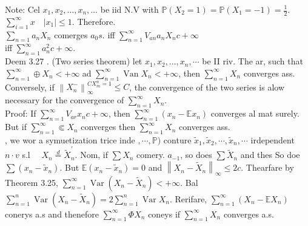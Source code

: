 \documentclass[11pt]{amsbook}
\theoremstyle{plain}%
\theoremstyle{definition}
\theoremstyle{remark}
\begin{document}
Note: Cel $x_{1}, x_{2}, \ldots, x_{n}, \ldots$ be iid N.V with $\mathbb{P}\left(X_{2}=1\right)=\mathbb{P}\left(X_{1}=-1\right)=\frac{1}{2}$.\\
$\sum_{i=1}^{\infty} x \quad\left|x_{1}\right| \leqslant 1$. Therefore.\\
$\sum_{n=1} a_{n} X_{n}$ comerges $a_{0} s$. iff $\sum_{n=1}^{\infty} V_{a n} a_{n} X_{n} c+\infty$\\
iff $\sum_{n=1}^{\infty} a_{n}^{2} c+\infty$.\\
Deem 3.27 . (Two series theorem) let $x_{1}, x_{2}, \ldots, x_{n}, \cdots$ be II riv. The ar, such that $\sum_{n=1}^{\infty} \oplus X_{n}<+\infty$ ad $\sum_{n=1}^{\infty} \operatorname{Van} X_{n}<+\infty$, then $\sum_{n=1}^{\infty} X_{n}$ converges ass. Conversely, if $\left\|X_{n}^{-}\right\|_{\infty}^{C X_{m}^{n}=1} \leq C$, the convergence of the two series is alow necessary for the convergence of $\sum_{n=1}^{\infty} X_{n}$.\\
Proof: If $\sum_{n=1}^{\infty} V_{a r} x_{n} c+\infty$, then $\sum_{n=1}^{\infty}\left(x_{n}-\mathbb{E} x_{n}\right)$ converges al mat surely. But if $\sum_{n=1}^{\infty} \Subset X_{n}$ converges then $\sum_{n=1}^{\infty} X_{n}$ converges ass.\\
, we wor a symuetization trice inde $, \cdots, \mathbb{P})$ conture $\tilde{x}_{1}, \tilde{x}_{2}, \cdots, \tilde{x}_{n}, \cdots$ irdependent $n \cdot v$ s.l $\quad X_{n} \stackrel{d}{=} \tilde{X}_{n}^{\prime}$. Nom, if $\sum X_{n}$ comery. $a_{-1}$, so does $\sum \tilde{X}_{n}$ and thes So doe $\sum\left(x_{n}-\tilde{x}_{n}\right)$. But $\mathbb{E}\left(x_{n}-\tilde{x}_{n}\right)=0$ and $\left\|X_{n}-\tilde{X}_{n}\right\|_{\infty} \leqslant 2 c$. Thearfare by Theorem 3.25, $\sum_{n=1}^{\infty} \operatorname{Var}\left(X_{n}-\tilde{X}_{n}\right)<+\infty$. Bal $\sum_{n=1}^{n} \operatorname{Var}\left(X_{n}-\tilde{X}_{n}\right)=2 \sum_{n=1}^{n} \operatorname{Var} X_{n}$. Rerifare, $\sum_{n=1}^{\infty}\left(X_{n}-\mathbb{E} X_{n}\right)$ conerys a.s and thenefore $\sum_{n=1}^{\infty} \Phi X_{n}$ coneys if $\sum_{n=1}^{\infty} X_{n}$ converges a.s.
\end{document}
